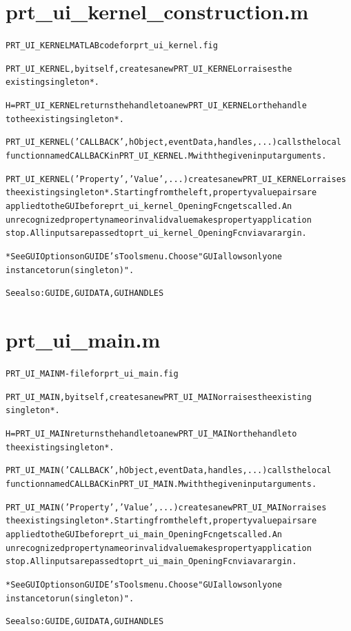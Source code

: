 \section{prt\_ui\_kernel\_construction.m}
\begin{alltt}

 PRT\_UI\_KERNEL MATLAB code for prt\_ui\_kernel.fig
 
 PRT\_UI\_KERNEL, by itself, creates a new PRT\_UI\_KERNEL or raises the 
 existing singleton*.
 
 H = PRT\_UI\_KERNEL returns the handle to a new PRT\_UI\_KERNEL or the handle
 to the existing singleton*.
 
 PRT\_UI\_KERNEL('CALLBACK',hObject,eventData,handles,...) calls the local
 function named CALLBACK in PRT\_UI\_KERNEL.M with the given input arguments.
 
 PRT\_UI\_KERNEL('Property','Value',...) creates a new PRT\_UI\_KERNEL or raises
 the existing singleton*.  Starting from the left, property value pairs are
 applied to the GUI before prt\_ui\_kernel\_OpeningFcn gets called.  An
 unrecognized property name or invalid value makes property application
 stop.  All inputs are passed to prt\_ui\_kernel\_OpeningFcn via varargin.
 
 *See GUI Options on GUIDE's Tools menu.  Choose "GUI allows only one
  instance to run (singleton)".
 
 See also: GUIDE, GUIDATA, GUIHANDLES
\end{alltt}


\section{prt\_ui\_main.m}
\begin{alltt}

 PRT\_UI\_MAIN M-file for prt\_ui\_main.fig
 
 PRT\_UI\_MAIN, by itself, creates a new PRT\_UI\_MAIN or raises the existing
 singleton*.
 
 H = PRT\_UI\_MAIN returns the handle to a new PRT\_UI\_MAIN or the handle to
 the existing singleton*.
 
 PRT\_UI\_MAIN('CALLBACK',hObject,eventData,handles,...) calls the local
 function named CALLBACK in PRT\_UI\_MAIN.M with the given input arguments.
 
 PRT\_UI\_MAIN('Property','Value',...) creates a new PRT\_UI\_MAIN or raises 
 the existing singleton*.  Starting from the left, property value pairs are
 applied to the GUI before prt\_ui\_main\_OpeningFcn gets called.  An
 unrecognized property name or invalid value makes property application
 stop.  All inputs are passed to prt\_ui\_main\_OpeningFcn via varargin.
 
 *See GUI Options on GUIDE's Tools menu.  Choose "GUI allows only one
  instance to run (singleton)".
 
 See also: GUIDE, GUIDATA, GUIHANDLES
\end{alltt}


